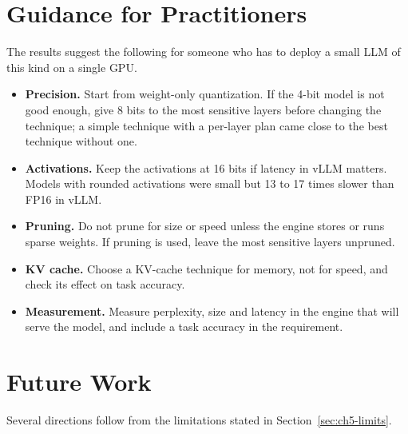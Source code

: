 \documentclass[
11pt, %
english, %
singlespacing, %
headsepline, %
]{MastersDoctoralThesis} %
\begin{document}
\section{Guidance for Practitioners}
\label{sec:ch6-guidance}

The results suggest the following for someone who has to deploy a small LLM of this kind on a single GPU.

\begin{itemize}
  \item \textbf{Precision.} Start from weight-only quantization. If the 4-bit model is not good enough, give 8 bits to the most sensitive layers before changing the technique; a simple technique with a per-layer plan came close to the best technique without one.
  \item \textbf{Activations.} Keep the activations at 16 bits if latency in vLLM matters. Models with rounded activations were small but 13 to 17 times slower than FP16 in vLLM.
  \item \textbf{Pruning.} Do not prune for size or speed unless the engine stores or runs sparse weights. If pruning is used, leave the most sensitive layers unpruned.
  \item \textbf{KV cache.} Choose a KV-cache technique for memory, not for speed, and check its effect on task accuracy.
  \item \textbf{Measurement.} Measure perplexity, size and latency in the engine that will serve the model, and include a task accuracy in the requirement.
\end{itemize}

\section{Future Work}
\label{sec:ch6-future}

Several directions follow from the limitations stated in Section~\ref{sec:ch5-limits}.
\end{document}
